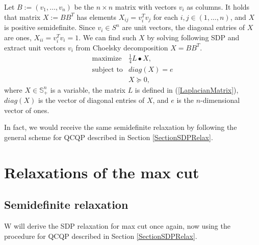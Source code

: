 \documentclass[12pt]{book}
\theoremstyle{definition}
\begin{document}
Let $B := (v_1,\dots ,v_n)$ be the $n\times n$ matrix with vectors $v_i$ as columns. 
It holds that matrix $X:= BB^T$ has elements $ X_{ij} = v_i^Tv_j $ for each $i,j\in (1,\dots,n)$, and $X$ is positive semidefinite.
Since $v_i\in S^n$ are unit vectors, the diagonal entries of $X$ are ones, $X_{ii} = v_i^Tv_i = 1$.
We can find such $X$ by solving following SDP and extract unit vectors $v_i$ from Choelsky decomposition $X = BB^T$.
\begin{equation}
\label{maxcutRelax2}
\begin{array}{ll}
\mbox{maximize} & \frac{1}{4}L\bullet X, \\
\mbox{subject to} & diag(X) = e \\
&	X\succeq 0,
\end{array}
\end{equation} 
where $X\in\mathbb{S}^n_+$ is a variable, the matrix $L$ is defined in (\ref{LaplacianMatrix}), $diag(X)$ is the vector of diagonal entries of $X$, and $e$ is the $n$-dimensional vector of ones.

\rem In fact, we would receive the same semidefinite relaxation by following the general scheme for QCQP described in Section \ref{SectionSDPRelax}.


\section{Relaxations of the max cut}
\label{SectionMaxCutRelaxation}


\subsection{Semidefinite relaxation}
W will derive the SDP relaxation for max cut once again, now using the procedure for QCQP described in Section \ref{SectionSDPRelax}.
\end{document}
